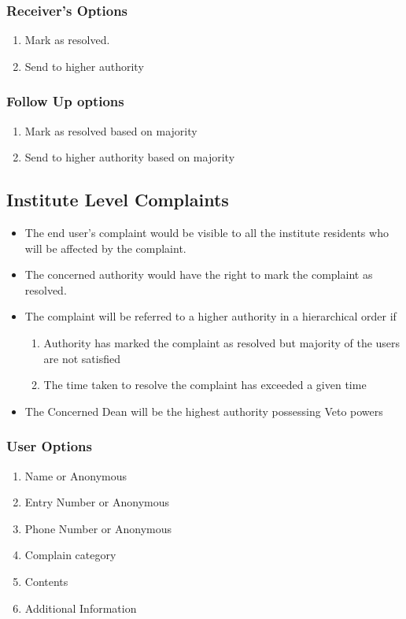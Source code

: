 \documentclass{article}
\begin{document}
			\subsubsection{Receiver's Options}
				\begin{enumerate}
					\item Mark as resolved.
					\item Send to higher authority
				\end{enumerate}
			\subsubsection{Follow Up options}
				\begin{enumerate}
					\item Mark as resolved based on majority
					\item Send to higher authority based on majority
				\end{enumerate}
		\subsection{Institute Level Complaints}
		\begin{itemize}
		\item The end user's complaint would be visible to all the institute residents who will be affected by the complaint.
		\item The concerned authority would have the right to mark the complaint as resolved.
		\item The complaint will be referred to a higher authority in a hierarchical order if 
			\begin{enumerate}
			\item Authority has marked the complaint as resolved but majority of the users are not satisfied
			\item The time taken to resolve the complaint has exceeded a given time 
			\end{enumerate}
		\item The Concerned Dean will be the highest authority possessing Veto powers 
		\end{itemize}
			\subsubsection{User Options}
				\begin{enumerate}
					\item Name or Anonymous
					\item Entry Number or Anonymous 
					\item Phone Number or Anonymous
					\item Complain category
					\item Contents
					\item Additional Information
				\end{enumerate}
\end{document}
